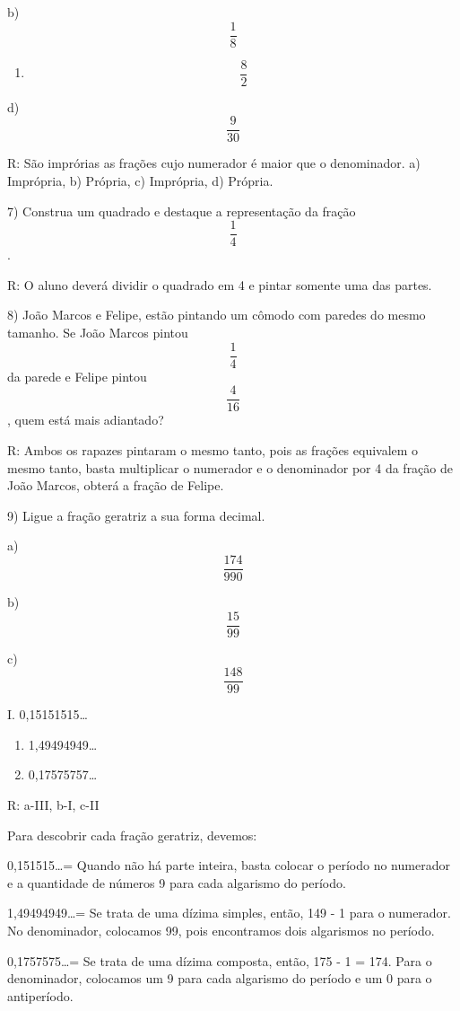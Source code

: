 b) \[\frac{1}{8}\]

\begin{enumerate}
\def\labelenumi{\alph{enumi})}
\setcounter{enumi}{2}
\tightlist
\item
  \[\frac{8}{2}\]
\end{enumerate}

d) \[\frac{9}{30}\]

R: São imprórias as frações cujo numerador é maior que o denominador. a)
Imprópria, b) Própria, c) Imprópria, d) Própria.

7) Construa um quadrado e destaque a representação da fração
\[\frac{1}{4}\].

R: O aluno deverá dividir o quadrado em 4 e pintar somente uma das
partes.

8) João Marcos e Felipe, estão pintando um cômodo com paredes do mesmo
tamanho. Se João Marcos pintou \[\frac{1}{4}\] da parede e Felipe pintou
\[\frac{4}{16}\], quem está mais adiantado?

R: Ambos os rapazes pintaram o mesmo tanto, pois as frações equivalem o
mesmo tanto, basta multiplicar o numerador e o denominador por 4 da
fração de João Marcos, obterá a fração de Felipe.

9) Ligue a fração geratriz a sua forma decimal.

a) \[\frac{174}{990}\]

b) \[\frac{15}{99}\]

c) \[\frac{148}{99}\]

I. 0,15151515\ldots{}

\begin{enumerate}
\def\labelenumi{\Roman{enumi}.}
\setcounter{enumi}{1}
\item
  1,49494949\ldots{}
\item
  0,17575757\ldots{}
\end{enumerate}

R: a-III, b-I, c-II

Para descobrir cada fração geratriz, devemos:

0,151515\ldots= Quando não há parte inteira, basta colocar o período no
numerador e a quantidade de números 9 para cada algarismo do período.

1,49494949\ldots= Se trata de uma dízima simples, então, 149 - 1 para o
numerador. No denominador, colocamos 99, pois encontramos dois
algarismos no período.

0,1757575\ldots= Se trata de uma dízima composta, então, 175 - 1 = 174.
Para o denominador, colocamos um 9 para cada algarismo do período e um 0
para o antiperíodo.

